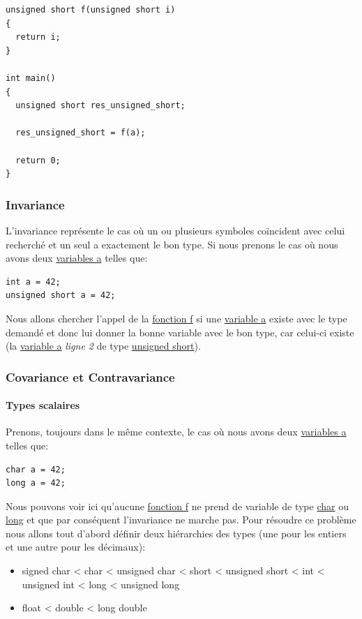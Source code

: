 \documentclass[12pt,a4paper]{article}
\begin{document}
\begin{NoHyper}
\begin{lstlisting}
unsigned short f(unsigned short i)
{
  return i;
}

int main()
{
  unsigned short res_unsigned_short;
  
  res_unsigned_short = f(a);
  
  return 0;
}
\end{lstlisting}

\subsubsection{Invariance}
L’invariance représente le cas où un ou plusieurs symboles coïncident avec celui recherché et un seul a exactement le bon type.\newline
Si nous prenons le cas où nous avons deux \underline{variables a} telles que:
\begin{lstlisting}
int a = 42;
unsigned short a = 42;
\end{lstlisting}
Nous allons chercher l'appel de la \underline{fonction f} si une \underline{variable a} existe avec le type demandé et donc lui donner la bonne variable avec le bon type, car celui-ci existe (la \underline{variable a} \textit{ligne 2} de type \underline{unsigned short}).

\subsubsection{Covariance et Contravariance}
\paragraph{Types scalaires\\}
Prenons, toujours dans le même contexte, le cas où nous avons deux \underline{variables a} telles que:
\begin{lstlisting}
char a = 42;
long a = 42;
\end{lstlisting}
Nous pouvons voir ici qu'aucune \underline{fonction f} ne prend de variable de type \underline{char} ou \underline{long} et que par conséquent l'invariance ne marche pas.\newline
Pour résoudre ce problème nous allons tout d'abord définir deux hiérarchies des types (une pour les entiers et une autre pour les décimaux):
\begin{itemize}
  \item signed char < char < unsigned char < short < unsigned short < int < unsigned int < long < unsigned long
  \item float < double < long double \\
\end{itemize}


\end{NoHyper}
\end{document}
